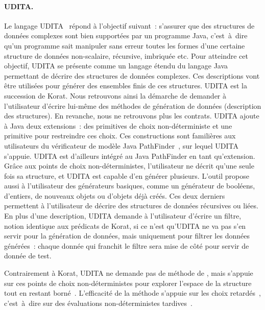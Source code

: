 \paragraph{UDITA.} Le langage UDITA~ répond à l'objectif
suivant~: s'assurer que des structures de données complexes sont bien supportées
par un programme Java, c'est~à~dire qu'un programme sait manipuler sans erreur
toutes les formes d'une certaine structure de données non-scalaire, récursive,
imbriquée etc. Pour atteindre cet objectif, UDITA se présente comme un langage
étendu du langage Java permettant de décrire des structures de données
complexes. Ces descriptions vont être utilisées pour générer des ensembles finis
de ces structures. UDITA est la succession de Korat. Nous retrouvons ainsi la
démarche de demander à l'utilisateur d'écrire lui-même des méthodes de
génération de données (description des structures). En revanche, nous ne
retrouvons plus les contrats. UDITA ajoute à Java deux extensions~: des
primitives de choix non-déterministe et une primitive pour restreindre ces
choix. Ces constructions sont familières aux utilisateurs du vérificateur de
modèle Java PathFinder~, sur lequel UDITA s'appuie. UDITA
est d'ailleurs intégré au  Java PathFinder en tant
qu'extension. Grâce aux points de choix non-déterministes, l'utilisateur ne
décrit qu'une seule fois sa structure, et UDITA est capable d'en générer
plusieurs. L'outil propose aussi à l'utilisateur des générateurs basiques, comme
un générateur de booléens, d'entiers, de nouveaux objets ou d'objets déjà créés.
Ces deux derniers permettent à l'utilisateur de décrire des structures de
données récursives ou liées. En plus d'une description, UDITA demande à
l'utilisateur d'écrire un filtre, notion identique aux prédicats de Korat, si ce
n'est qu'UDITA ne va pas s'en servir pour la génération de données, mais
uniquement pour filtrer les données générées~: chaque donnée qui franchit le
filtre sera mise de côté pour servir de donnée de test.

Contrairement à Korat, UDITA ne demande pas de méthode de
, mais s'appuie sur ces points de choix
non-déterministes pour explorer l'espace de la structure tout en restant
borné~. L'efficacité de la méthode s'appuie
sur les choix retardés~, c'est~à~dire sur des évaluations
non-déterministes tardives~.

